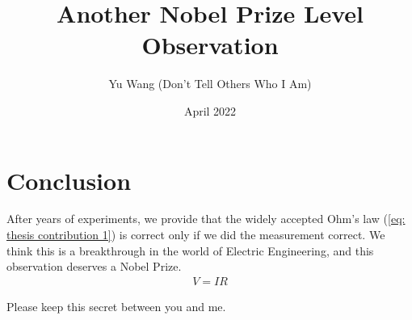 \documentclass{article}
\title{Another Nobel Prize Level Observation}
\author{Yu Wang (Don't Tell Others Who I Am)}
\date{April 2022}
\begin{document}
\maketitle

\section{Conclusion}
After years of experiments, we provide that the widely accepted Ohm's law (\ref{eq: thesis contribution 1}) is correct only if we did the measurement correct. We think this is a breakthrough in the world of Electric Engineering, and this observation deserves a Nobel Prize.
\begin{align}
    V = IR \label{eq: thesis contribution 1}
\end{align}

Please keep this secret between you and me.
\end{document}
